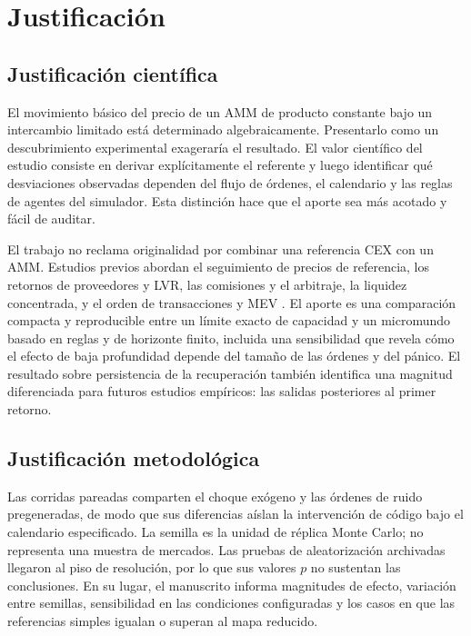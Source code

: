 \chapter{Justificación}
\label{cap:justificacion}

\section{Justificación científica}

El movimiento básico del precio de un AMM de producto constante bajo un intercambio limitado está determinado algebraicamente. Presentarlo como un descubrimiento experimental exageraría el resultado. El valor científico del estudio consiste en derivar explícitamente el referente y luego identificar qué desviaciones observadas dependen del flujo de órdenes, el calendario y las reglas de agentes del simulador. Esta distinción hace que el aporte sea más acotado y fácil de auditar.

El trabajo no reclama originalidad por combinar una referencia CEX con un AMM. Estudios previos abordan el seguimiento de precios de referencia, los retornos de proveedores y LVR, las comisiones y el arbitraje, la liquidez concentrada, y el orden de transacciones y MEV \cite{angeris2020uniswap,milionis2022lvr,heimbach2022risks,daian2020flash,adams2021uniswapv3}. El aporte es una comparación compacta y reproducible entre un límite exacto de capacidad y un micromundo basado en reglas y de horizonte finito, incluida una sensibilidad que revela cómo el efecto de baja profundidad depende del tamaño de las órdenes y del pánico. El resultado sobre persistencia de la recuperación también identifica una magnitud diferenciada para futuros estudios empíricos: las salidas posteriores al primer retorno.

\section{Justificación metodológica}

Las corridas pareadas comparten el choque exógeno y las órdenes de ruido pregeneradas, de modo que sus diferencias aíslan la intervención de código bajo el calendario especificado. La semilla es la unidad de réplica Monte Carlo; no representa una muestra de mercados. Las pruebas de aleatorización archivadas llegaron al piso de resolución, por lo que sus valores $p$ no sustentan las conclusiones. En su lugar, el manuscrito informa magnitudes de efecto, variación entre semillas, sensibilidad en las condiciones configuradas y los casos en que las referencias simples igualan o superan al mapa reducido.

